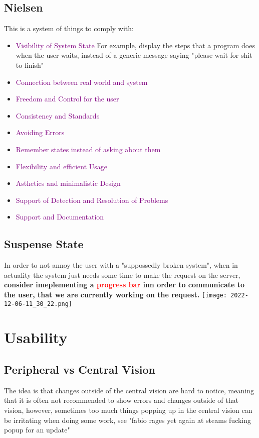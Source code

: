 \documentclass[main.tex,fontsize=6pt,paper=a4,paper=landscape,DIV=calc,]{scrartcl}
\begin{document}
\begin{multicols*}{4}
\subsection{Nielsen}  
This is a system of things to comply with:\newline
\begin{itemize}
\item \textcolor{purple}{Visibility of System State}\newline
  For example, display the steps that a program does when the user waits, instead of a generic message saying "please wait for shit to finish"
\item \textcolor{purple}{Connection between real world and system}
\item \textcolor{purple}{Freedom and Control for the user}
\item \textcolor{purple}{Consistency and Standards}
\item \textcolor{purple}{Avoiding Errors}
\item \textcolor{purple}{Remember states instead of asking about them}
\item \textcolor{purple}{Flexibility and efficient Usage}
\item \textcolor{purple}{Asthetics and minimalistic Design}
\item \textcolor{purple}{Support of Detection and Resolution of Problems}
\item \textcolor{purple}{Support and Documentation}
\end{itemize} 

\subsection{Suspense State} 
In order to not annoy the user with a "suppossedly broken system", when in actuality the system just needs some time to make the request on the server, \textbf{consider imeplementing a \textcolor{red}{progress bar} inn order to communicate to the user, that we are currently working on the request.}\newline
\texttt{[image: 2022-12-06-11\_30\_22.png]}

\section{Usability}

\subsection{Peripheral vs Central Vision}  
The idea is that changes outside of the central vision are hard to notice, meaning that it is often not recommended to show errors and changes outside of that vision, however, sometimes too much things popping up in the central vision can be irritating when doing some work, see "fabio rages yet again at steams fucking popup for an update"\newline


\end{multicols*}
\end{document}
